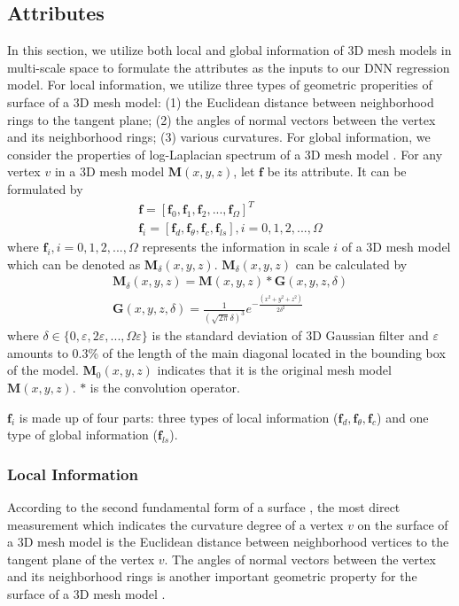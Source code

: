 \documentclass[runningheads]{article}
\begin{document}
\subsection{Attributes}
In this section, we utilize both local and global information of 3D mesh models in multi-scale space to formulate the attributes as the inputs to our DNN regression model. For local information, we utilize three types of geometric properities of surface of a 3D mesh model: (1) the Euclidean distance between neighborhood rings to the tangent plane; (2) the angles of normal vectors between the vertex and its neighborhood rings; (3) various curvatures. For global information, we consider the properties of log-Laplacian spectrum of a 3D mesh model \cite{song2014mesh}. For any vertex \emph{$v$} in a 3D mesh model \emph{$\bm{M}(x,y,z)$}, let \emph{$\bm{f}$} be its attribute. It can be formulated by
\begin{gather}
	\bm{f} = [\bm{f}_0,\bm{f}_1,\bm{f}_2,...,\bm{f}_\varOmega]^T\\
	\bm{f}_i = [\bm{f}_{d},\bm{f}_{\theta},\bm{f}_{c},\bm{f}_{ls}], i = 0,1,2,...,\varOmega
\end{gather}
where \emph{$\bm{f}_i,i=0,1,2,...,\varOmega$} represents the information in scale \emph{$i$} of a 3D mesh model which can be denoted as \emph{$\bm{M}_\delta(x,y,z)$}. \emph{$\bm{M}_\delta(x,y,z)$} can be calculated by
\begin{gather}
	\bm{M}_\delta(x,y,z)=\bm{M}(x,y,z)*\bm{G}(x,y,z,\delta)\\
	\bm{G}(x,y,z,\delta)=\frac{1}{(\sqrt{2\pi}\delta)^{3}}e^{-\frac{(x^{2}+y^{2}+z^{2})}{2\delta^2}}
\end{gather}
where \emph{$\delta \in \{0,\varepsilon,2\varepsilon,...,\varOmega\varepsilon\}$} is the standard deviation of 3D Gaussian filter and \emph{$\varepsilon$} amounts to 0.3\% of the length of the main diagonal located in the bounding box of the model. \emph{$\bm{M}_0(x,y,z)$} indicates that it is the original mesh model \emph{$\bm{M}(x,y,z)$}. \emph{$*$} is the convolution operator.

\emph{$\bm{f}_i$} is made up of  four parts: three types of local information (\emph{$\bm{f}_d,\bm{f}_\theta,\bm{f}_c$}) and one type of global information (\emph{$\bm{f}_{ls}$}).

\subsubsection{Local Information}
According to the second fundamental form of a surface \cite{harris1989second}, the most direct measurement which indicates the curvature degree of a vertex \emph{$v$} on the surface of a 3D mesh model is the Euclidean distance between neighborhood vertices to the tangent plane of the vertex \emph{$v$}. The angles of normal vectors between the vertex and its neighborhood rings is another important geometric property for the surface of a 3D mesh model \cite{don20143d}.
\end{document}
